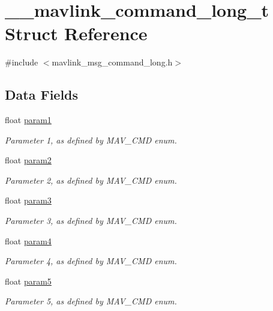 \hypertarget{struct____mavlink__command__long__t}{\section{\+\_\+\+\_\+mavlink\+\_\+command\+\_\+long\+\_\+t Struct Reference}
\label{struct____mavlink__command__long__t}
}


{\ttfamily \#include $<$mavlink\+\_\+msg\+\_\+command\+\_\+long.\+h$>$}

\subsection*{Data Fields}
\begin{DoxyCompactItemize}
\item 
float \hyperlink{struct____mavlink__command__long__t_a8bb82d921422fd825276bbc43502fc77}{param1}
\begin{DoxyCompactList}\small\item\em Parameter 1, as defined by M\+A\+V\+\_\+\+C\+M\+D enum. \end{DoxyCompactList}\item 
float \hyperlink{struct____mavlink__command__long__t_a715bfae8c34e8882b82efbb2bd0e580c}{param2}
\begin{DoxyCompactList}\small\item\em Parameter 2, as defined by M\+A\+V\+\_\+\+C\+M\+D enum. \end{DoxyCompactList}\item 
float \hyperlink{struct____mavlink__command__long__t_a9b11618cd6d409944727cfcc0d637f72}{param3}
\begin{DoxyCompactList}\small\item\em Parameter 3, as defined by M\+A\+V\+\_\+\+C\+M\+D enum. \end{DoxyCompactList}\item 
float \hyperlink{struct____mavlink__command__long__t_a1448f543670b7a8973c6461254cce429}{param4}
\begin{DoxyCompactList}\small\item\em Parameter 4, as defined by M\+A\+V\+\_\+\+C\+M\+D enum. \end{DoxyCompactList}\item 
float \hyperlink{struct____mavlink__command__long__t_a9c74f309b82fed5527bf1e7732424f21}{param5}
\begin{DoxyCompactList}\small\item\em Parameter 5, as defined by M\+A\+V\+\_\+\+C\+M\+D enum. \end{DoxyCompactList}\item 

\end{DoxyCompactItemize}
